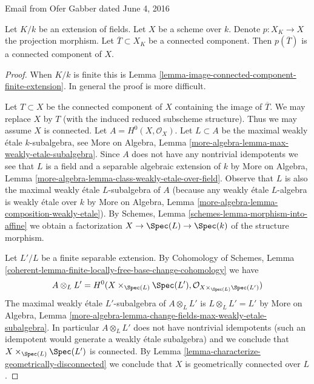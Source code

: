 \begin{lemma}[Gabber]
\label{lemma-image-connected-component}
\begin{reference}
Email from Ofer Gabber dated June 4, 2016
\end{reference}
Let $K/k$ be an extension of fields. Let $X$ be a scheme over $k$.
Denote $p : X_K \to X$ the projection morphism.
Let $\overline{T} \subset X_K$ be a connected component.
Then $p(\overline{T})$ is a connected component of $X$.
\end{lemma}

\begin{proof}
When $K/k$ is finite this is
Lemma \ref{lemma-image-connected-component-finite-extension}.
In general the proof is more difficult.

\medskip\noindent
Let $T \subset X$ be the connected component of $X$ containing
the image of $\overline{T}$. We may replace $X$ by $T$
(with the induced reduced subscheme structure). Thus we
may assume $X$ is connected. Let $A = H^0(X, \mathcal{O}_X)$.
Let $L \subset A$ be the maximal weakly \'etale $k$-subalgebra, see
More on Algebra, Lemma \ref{more-algebra-lemma-max-weakly-etale-subalgebra}.
Since $A$ does not have any nontrivial idempotents we see
that $L$ is a field and a separable algebraic extension of $k$ by
More on Algebra, Lemma \ref{more-algebra-lemma-class-weakly-etale-over-field}.
Observe that $L$ is also the maximal weakly \'etale $L$-subalgebra of $A$
(because any weakly \'etale $L$-algebra is weakly \'etale over $k$
by More on Algebra, Lemma \ref{more-algebra-lemma-composition-weakly-etale}).
By Schemes, Lemma \ref{schemes-lemma-morphism-into-affine}
we obtain a factorization $X \to \Spec(L) \to \Spec(k)$
of the structure morphism.

\medskip\noindent
Let $L'/L$ be a finite separable extension. By
Cohomology of Schemes, Lemma
\ref{coherent-lemma-finite-locally-free-base-change-cohomology}
we have
$$
A \otimes_L L' =
H^0(X \times_{\Spec(L)} \Spec(L'), \mathcal{O}_{X \times_{\Spec(L)} \Spec(L')})
$$
The maximal weakly \'etale $L'$-subalgebra of $A \otimes_L L'$
is $L \otimes_L L' = L'$ by More on Algebra, Lemma
\ref{more-algebra-lemma-change-fields-max-weakly-etale-subalgebra}.
In particular $A \otimes_L L'$ does not have nontrivial idempotents
(such an idempotent would generate a weakly \'etale subalgebra)
and we conclude that $X \times_{\Spec(L)} \Spec(L')$ is connected.
By Lemma \ref{lemma-characterize-geometrically-disconnected}
we conclude that $X$ is geometrically connected over $L$.


\end{proof}
